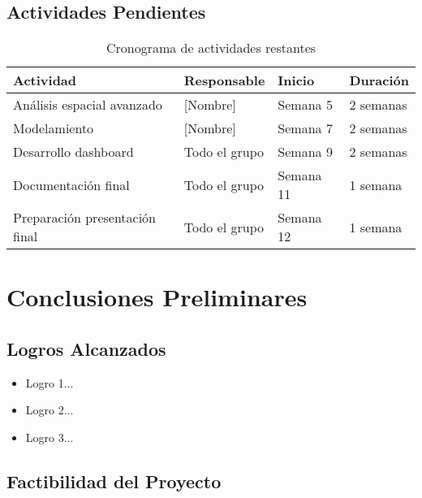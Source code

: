 \documentclass[11pt,letterpaper]{article}
\begin{document}
\subsection{Actividades Pendientes}

\begin{table}[H]
\centering
\caption{Cronograma de actividades restantes}
\begin{tabular}{@{}llll@{}}
\toprule
\textbf{Actividad} & \textbf{Responsable} & \textbf{Inicio} & \textbf{Duración} \\
\midrule
Análisis espacial avanzado & [Nombre] & Semana 5 & 2 semanas \\
Modelamiento & [Nombre] & Semana 7 & 2 semanas \\
Desarrollo dashboard & Todo el grupo & Semana 9 & 2 semanas \\
Documentación final & Todo el grupo & Semana 11 & 1 semana \\
Preparación presentación final & Todo el grupo & Semana 12 & 1 semana \\
\bottomrule
\end{tabular}
\end{table}



\section{Conclusiones Preliminares}

\subsection{Logros Alcanzados}

\begin{itemize}
    \item Logro 1...
    \item Logro 2...
    \item Logro 3...
\end{itemize}

\subsection{Factibilidad del Proyecto}

\end{document}
